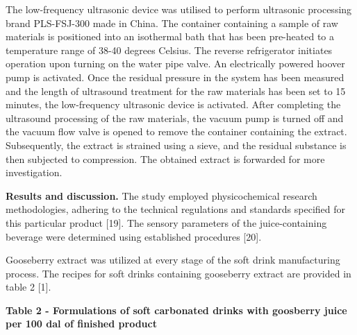 The low-frequency ultrasonic device was utilised to perform ultrasonic
processing brand PLS-FSJ-300 made in China. The container containing a
sample of raw materials is positioned into an isothermal bath that has
been pre-heated to a temperature range of 38-40 degrees Celsius. The
reverse refrigerator initiates operation upon turning on the water pipe
valve. An electrically powered hoover pump is activated. Once the
residual pressure in the system has been measured and the length of
ultrasound treatment for the raw materials has been set to 15 minutes,
the low-frequency ultrasonic device is activated. After completing the
ultrasound processing of the raw materials, the vacuum pump is turned
off and the vacuum flow valve is opened to remove the container
containing the extract. Subsequently, the extract is strained using a
sieve, and the residual substance is then subjected to compression. The
obtained extract is forwarded for more investigation.~

{\bfseries Results and discussion.} The study employed physicochemical
research methodologies, adhering to the technical regulations and
standards specified for this particular product {[}19{]}. The sensory
parameters of the juice-containing beverage were determined using
established procedures {[}20{]}.~

Gooseberry extract was utilized at every stage of the soft drink
manufacturing process. The recipes for soft drinks containing gooseberry
extract are provided in table 2 {[}1{]}.

{\bfseries Table 2 - Formulations of soft carbonated drinks with goosberry
juice per 100 dal of finished product}

